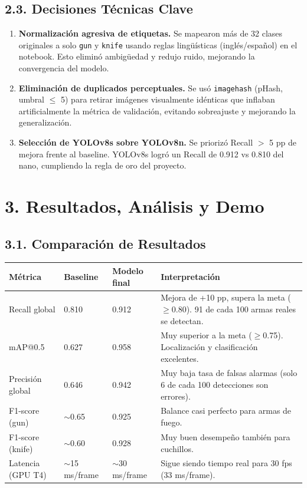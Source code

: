 \documentclass[12pt, letterpaper]{article}
\begin{document}
\subsection{2.3. Decisiones Técnicas Clave}

\begin{enumerate}
    \item \textbf{Normalización agresiva de etiquetas.} Se mapearon más de 32 clases originales a solo \texttt{gun} y \texttt{knife} usando reglas lingüísticas (inglés/español) en el notebook. Esto eliminó ambigüedad y redujo ruido, mejorando la convergencia del modelo.
    \item \textbf{Eliminación de duplicados perceptuales.} Se usó \texttt{imagehash} (pHash, umbral $\leq$ 5) para retirar imágenes visualmente idénticas que inflaban artificialmente la métrica de validación, evitando sobreajuste y mejorando la generalización.
    \item \textbf{Selección de YOLOv8s sobre YOLOv8n.} Se priorizó Recall $>$ 5 pp de mejora frente al baseline. YOLOv8s logró un Recall de 0.912 vs 0.810 del nano, cumpliendo la regla de oro del proyecto.
\end{enumerate}

\section{3. Resultados, Análisis y Demo}

\subsection{3.1. Comparación de Resultados}

\begin{center}
\begin{tabular}{L{3cm} L{2cm} L{2.5cm} L{5cm}}
\toprule
\textbf{Métrica} & \textbf{Baseline} & \textbf{Modelo final} & \textbf{Interpretación} \\
\midrule
Recall global & 0.810 & 0.912 & Mejora de +10 pp, supera la meta ($\geq$0.80). 91 de cada 100 armas reales se detectan. \\
mAP@0.5 & 0.627 & 0.958 & Muy superior a la meta ($\geq$0.75). Localización y clasificación excelentes. \\
Precisión global & 0.646 & 0.942 & Muy baja tasa de falsas alarmas (solo 6 de cada 100 detecciones son errores). \\
F1-score (gun) & $\sim$0.65 & 0.925 & Balance casi perfecto para armas de fuego. \\
F1-score (knife) & $\sim$0.60 & 0.928 & Muy buen desempeño también para cuchillos. \\
Latencia (GPU T4) & $\sim$15 ms/frame & $\sim$30 ms/frame & Sigue siendo tiempo real para 30 fps (33 ms/frame). \\
\bottomrule
\end{tabular}
\end{center}
\end{document}
